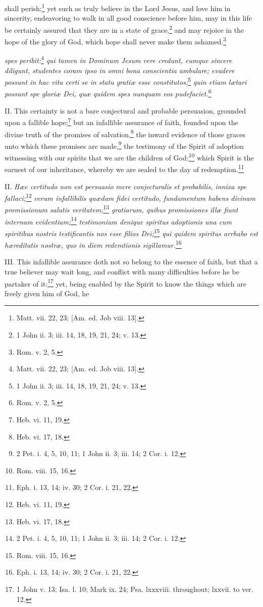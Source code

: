 shall perish:\footnote{Matt. vii. 22, 23; [Am. ed. Job viii. 13].} yet such as truly believe in the Lord Jesus, and love him in sincerity, endeavoring to walk in all good conscience before him, may in this life be certainly assured that they are in a state of grace,\footnote{1 John ii. 3; iii. 14, 18, 19, 21, 24; v. 13.} and may rejoice in the hope of the glory of God, which hope shall never make them ashamed.\footnote{Rom. v. 2, 5.}

\emph{spes peribit:}\footnote{Matt. vii. 22, 23; [Am. ed. Job viii. 13].}\emph{ qui tamen in Dominum Jesum vere credunt, eumque sincere diligunt, studentes coram ipso in omni bona conscientia ambulare; evadere possunt in hac vita certi se in statu gratiæ esse constitutos;}\footnote{1 John ii. 3; iii. 14, 18, 19, 21, 24; v. 13.}\emph{ quin etiam lætari possunt spe gloriæ Dei, quæ quidem spes nunquam eos pudefaciet.}\footnote{Rom. v. 2, 5.}

II. This certainty is not a bare conjectural and probable persuasion, grounded upon a fallible hope;\footnote{Heb. vi. 11, 19.} but an infallible assurance of faith, founded upon the divine truth of the promises of salvation,\footnote{Heb. vi. 17, 18.} the inward evidence of those graces unto which these promises are made,\footnote{2 Pet. i. 4, 5, 10, 11; 1 John ii. 3; iii. 14; 2 Cor. i. 12.} the testimony of the Spirit of adoption witnessing with our spirits that we are the children of God:\footnote{Rom. viii. 15, 16.} which Spirit is the earnest of our inheritance, whereby we are sealed to the day of redemption.\footnote{Eph. i. 13, 14; iv. 30; 2 Cor. i. 21, 22.}

II. \emph{Hæc certitudo non est persuasio mere conjecturalis et probabilis, innixa spe fallaci;}\footnote{Heb. vi. 11, 19.}\emph{ verum infallibilis quædam fidei certitudo, fundamentum habens divinam promissionum salutis veritatem;}\footnote{Heb. vi. 17, 18.}\emph{ gratiarum, quibus promissiones illæ fiunt internam evidentiam;}\footnote{2 Pet. i. 4, 5, 10, 11; 1 John ii. 3; iii. 14; 2 Cor. i. 12.}\emph{ testimonium denique spiritus adoptionis una cum spiritibus nostris testificantis nos esse filios Dei;}\footnote{Rom. viii. 15, 16.}\emph{ qui quidem spiritus arrhabo est hæreditatis nostræ, quo in diem redemtionis sigillamur.}\footnote{Eph. i. 13, 14; iv. 30; 2 Cor. i. 21, 22.}

III. This infallible assurance doth not so belong to the essence of faith, but that a true believer may wait long, and conflict with many difficulties before he be partaker of it:\footnote{1 John v. 13; Isa. l. 10; Mark ix. 24; Psa. lxxxviii. throughout; lxxvii. to ver. 12.} yet, being enabled by the Spirit to know the things which are freely given him of God, he

